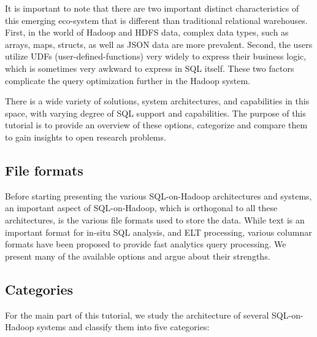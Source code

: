 \documentclass{vldb}
\begin{document}
It is important to note that there are two important distinct characteristics of this emerging eco-system that is different than traditional relational warehouses. First, in the world of Hadoop and HDFS data, complex data types, such as arrays, maps, structs, as well as JSON data are more prevalent. Second, the users utilize UDFs (user-defined-functions) very widely to express their business logic, which is sometimes very awkward to express in SQL itself. These two factors complicate the query optimization further in the Hadoop system. 

There is a wide variety of solutions, system architectures, and capabilities in this space, with varying degree of SQL support and capabilities. The purpose of this tutorial is to provide an overview of these options, categorize and compare them to gain insights to open research problems. 

\subsection{File formats}
Before starting presenting the various SQL-on-Hadoop architectures and systems, an important aspect of SQL-on-Hadoop, which is orthogonal to all these architectures, is the various file formats used to store the data. While text is an important format for in-situ SQL analysis, and ELT processing, various columnar formats have been proposed to provide fast analytics query processing. We present many of the available options and argue about their strengths.

\subsection{Categories}
For the main part of this tutorial, we study the architecture of several SQL-on-Hadoop systems and classify them into five categories:
\end{document}
